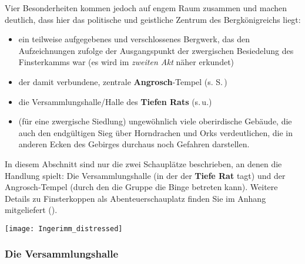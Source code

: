 Vier Besonderheiten kommen jedoch auf engem Raum zusammen und machen deutlich, dass hier das politische und geistliche Zentrum des Bergkönigreichs liegt:
\begin{itemize}
	\item ein teilweise aufgegebenes und verschlossenes Bergwerk, das den Aufzeichnungen zufolge der Ausgangspunkt der zwergischen Besiedelung des Finsterkamms war (es wird im \emph{zweiten Akt} näher erkundet)
	\item der damit verbundene, zentrale \textbf{Angrosch}-Tempel (s. S.\,\pageref{angrosch})
	\item die Versammlungshalle/Halle des \textbf{Tiefen Rats} (s.\,u.)
	\item (für eine zwergische Siedlung)  ungewöhnlich viele oberirdische Gebäude, die auch den endgültigen Sieg über Horndrachen und Orks verdeutlichen,
	die in anderen Ecken des Gebirges durchaus noch Gefahren darstellen.
\end{itemize}

In diesem Abschnitt sind nur die zwei Schauplätze beschrieben, an denen die Handlung spielt: Die Versammlungshalle (in der der \textbf{Tiefe Rat} tagt) und der Angrosch-Tempel (durch den die Gruppe die Binge betreten kann). Weitere Details zu Finsterkoppen als Abenteuerschauplatz finden Sie im Anhang mitgeliefert (\pageref{hdb_anhang_finsterkoppen}).


\begin{center}
\vspace{-0.4cm}
\texttt{[image: Ingerimm\_distressed]}
\vspace{-0.5cm}
\end{center}

\subsubsection{Die Versammlungshalle}


